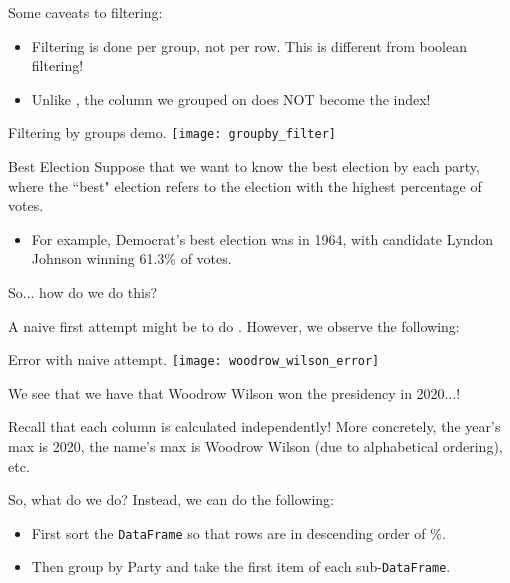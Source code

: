 \documentclass[openany]{book}
\begin{document}
\begin{warn}
	Some caveats to filtering:
	\begin{itemize}
		\item Filtering is done per group, not per row. This is different from boolean filtering!
		\item Unlike , the column we grouped on does NOT become the index!
	\end{itemize}
\end{warn}

\begin{figurebox}[]{Filtering by groups demo.}
	\centering\texttt{[image: groupby\_filter]}
\end{figurebox}

\begin{casestudy*}[parbox=false]{Best Election}{}
	Suppose that we want to know the best election by each party, where the ``best" election refers to the election with the highest percentage of votes.
	\begin{itemize}
		\item For example, Democrat’s best election was in 1964, with candidate Lyndon Johnson
		winning 61.3\% of votes.
	\end{itemize}

	So... how do we do this?
	
	A naive first attempt might be to do . However, we observe the following:
	
	\begin{figurebox}[]{Error with naive attempt.}
		\centering\texttt{[image: woodrow\_wilson\_error]}
	\end{figurebox}

	We see that we have that Woodrow Wilson won the presidency in 2020...!
	
	Recall that each column is calculated independently! More concretely, the year's max is 2020, the name's max is Woodrow Wilson (due to alphabetical ordering), etc.
	
	So, what do we do? Instead, we can do the following:
	\begin{itemize}
		\item First sort the \texttt{DataFrame} so that rows are in descending order of \%.
		\item Then group by Party and take the first item of each sub-\texttt{DataFrame}.		
	\end{itemize}


\end{casestudy*}
\end{document}
